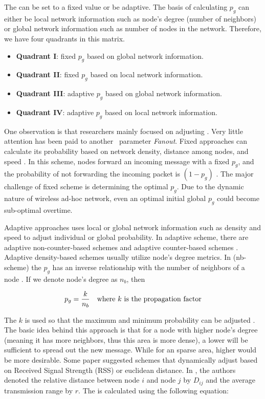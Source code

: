 The \emph{\pog} can be set to a fixed value or be adaptive. The basis of calculating $p_g$ can either be local network information such as node's degree (number of neighbors) or global network information such as number of nodes in the network. Therefore, we have four quadrants in this matrix. 

\begin{itemize}
	\item \textbf{Quadrant I}: fixed $p_g$ based on global network information. 
	\item \textbf{Quadrant II}: fixed $p_g$ based on local network information. 
	\item \textbf{Quadrant III}: adaptive $p_g$ based on global network information. 
	\item \textbf{Quadrant IV}: adaptive $p_g$ based on local network information. 
\end{itemize}

One observation is that researchers mainly focused on adjusting \emph{\pog}. Very little attention has been paid to another \gp ~parameter \emph{Fanout}. Fixed \emph{\pog} approaches can calculate its probability based on network density, distance among nodes, and speed \cite{2015survey}. In this scheme, nodes forward an incoming message with a fixed $p_g$, and the probability of not forwarding the incoming packet is $(1-p_g)$ \cite{2015survey}. The major challenge of fixed scheme is determining the optimal $p_g$. Due to the dynamic nature of wireless ad-hoc network, even an optimal initial global $p_g$ could become sub-optimal overtime. 

Adaptive \emph{\pog} approaches uses local or global network information such as density and speed to adjust individual or global probability. In adaptive scheme, there are adaptive non-counter-based schemes and adaptive counter-based schemes \cite{2015survey}. Adaptive density-based schemes usually utilize node's degree metrics. In (nb-scheme) the $p_g$ has an inverse relationship with the number of neighbors of a node \cite{cartigny2003border}. If we denote node's degree as $n_b$, then 

\[ p_g = \frac{k}{n_b} \mbox{\quad where $k$ is the propagation factor}\]

The $k$ is used so that the maximum and minimum probability can be adjusted \cite{cartigny2003border}. The basic idea behind this approach is that for a node with higher node's degree (meaning it has more neighbors, thus this area is more dense), a lower \emph{\pog} will be sufficient to spread out the new message. While for an sparse area, higher \emph{\pog} would be more desirable. Some paper \cite{qing2010dynamic}\cite{wisitpongphan2007broadcast} suggested schemes that dynamically adjust \emph{\pog} based on Received Signal Strength (RSS) or euclidean distance. In \cite{wisitpongphan2007broadcast}, the authors denoted the relative distance between node $i$ and node $j$ by $D_{ij}$ and the average transmission range by $r$. The \emph{\pog} is calculated using the following equation:

